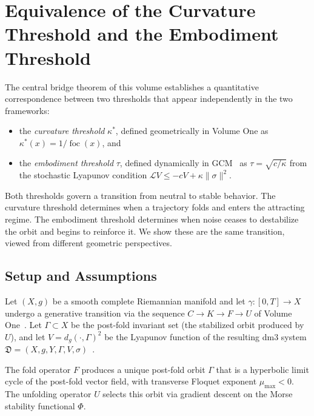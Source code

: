 
\section{Equivalence of the Curvature Threshold and the
  Embodiment Threshold}
\label{sec:threshold-equivalence}

The central bridge theorem of this volume establishes a
quantitative correspondence between two thresholds that appear
independently in the two frameworks:
\begin{itemize}[leftmargin=*]
  \item the \emph{curvature threshold} $\kappa^*$, defined
        geometrically in Volume One as
        $\kappa^*(x) = 1/\operatorname{foc}(x)$, and
  \item the \emph{embodiment threshold} $\tau$, defined
        dynamically in GCM~\cite{Paper1} as
        $\tau = \sqrt{c/\kappa}$ from the stochastic Lyapunov
        condition $\mathcal{L}V \le -cV + \kappa\|\sigma\|^2$.
\end{itemize}

Both thresholds govern a transition from neutral to stable
behavior. The curvature threshold determines when a trajectory
folds and enters the attracting regime. The embodiment threshold
determines when noise ceases to destabilize the orbit and begins
to reinforce it. We show these are the same transition, viewed
from different geometric perspectives.

\subsection{Setup and Assumptions}
\label{subsec:setup}

Let $(X,g)$ be a smooth complete Riemannian manifold and let
$\gamma\colon[0,T]\to X$ undergo a generative transition via the
sequence $C\to K\to F\to U$ of Volume One~\cite{PrincipiaI}.
Let $\Gamma\subset X$ be the post-fold invariant set (the
stabilized orbit produced by $U$), and let $V = d_g(\cdot,\Gamma)^2$
be the Lyapunov function of the resulting dm3 system
$\mathfrak{D}=(X,g,Y,\Gamma,V,\sigma)$~\cite{Paper1}.

\begin{assumption}\label{ass:fold-orbit}
The fold operator $F$ produces a unique post-fold orbit $\Gamma$
that is a hyperbolic limit cycle of the post-fold vector field,
with transverse Floquet exponent $\mu_{\max}<0$. The unfolding
operator $U$ selects this orbit via gradient descent on the
Morse stability functional $\Phi$.
\end{assumption}

